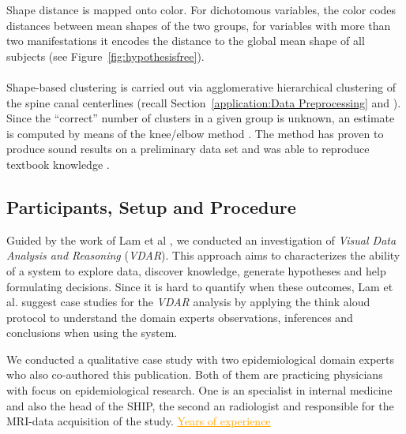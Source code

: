 \documentclass[journal]{style/vgtc} 			          %
\newcommand{\com}[1]{\textcolor{orange}{\uline{#1}}}
\begin{document}
Shape distance is mapped onto color.
%
For dichotomous variables, the color codes distances between mean shapes of the two groups, for variables with more than two manifestations it encodes the distance to the global mean shape of all subjects (see Figure~\ref{fig:hypothesisfree}).
\\\\
Shape-based clustering is carried out via agglomerative hierarchical clustering of the spine canal centerlines (recall Section~\ref{application:Data Preprocessing} and \cite{Klemm2013VMV}).
%
Since the ``correct'' number of clusters in a given group is unknown, an estimate is computed by means of the knee/elbow method \cite{Salvador2004}.
%
The method has proven to produce sound results on a preliminary data set and was able to reproduce textbook knowledge \cite{Klemm2013VMV}.
\subsection{Participants, Setup and Procedure}
%
%
Guided by the work of Lam et al \cite{Lam2012}, we conducted an investigation of \emph{Visual Data Analysis and Reasoning} (\emph{VDAR}).
%
This approach aims to characterizes the ability of a system to explore data, discover knowledge, generate hypotheses and help formulating decisions.
%
Since it is hard to quantify when these outcomes, Lam et al. suggest case studies for the \emph{VDAR} analysis by applying the think aloud protocol to understand the domain experts observations, inferences and conclusions when using the system.

We conducted a qualitative case study with two epidemiological domain experts who also co-authored this publication.
%
Both of them are practicing physicians with focus on epidemiological research.
%
One is an specialist in internal medicine and also the head of the SHIP, the second an radiologist and responsible for the MRI-data acquisition of the study. \com{Years of experience} %
%
%
\end{document}
